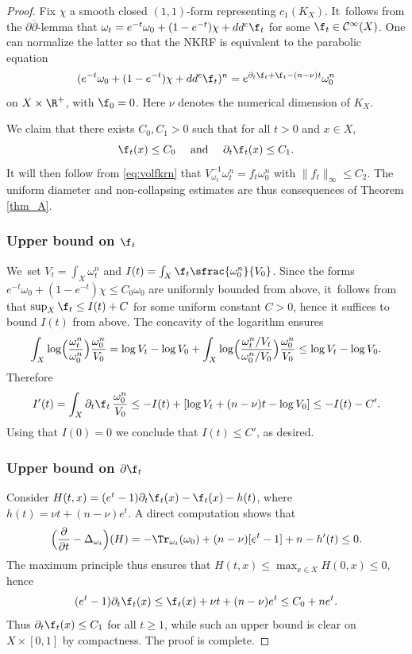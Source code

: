\begin{proof}
Fix $\chi$ a smooth closed $(1,1)$-form representing $c_1(K_X)$. It~follows from the $\partial\overline{\partial}$-lemma
that $\omega_t=e^{-t}\omega_0+(1-e^{-t}) \chi+dd^c \f_t$ for some $\f_t \in {\mathcal C}^{\infty}(X)$. One can normalize
the latter so that the NKRF is equivalent to the parabolic equation
\[
(e^{-t}\omega_0+(1-e^{-t}) \chi+dd^c \f_t)^n=e^{\partial_t \f_t+\f_t-(n-\nu)t} \omega_0^n
\]
on $X \times \R^+$, with $\f_0=0$. Here $\nu$ denotes the numerical dimension of $K_X$.

We claim that there exists $C_0,C_1>0$ such that for all $t>0$ and $x \in X$,
\[
\f_t(x) \leq C_0
\quad \text{ and } \quad
\partial_t \f_t(x) \leq C_1.
\]
It will then follow from \eqref{eq:volfkrn} that $V_{\omega_t}^{-1}\omega_t^n=f_t \omega_0^n$ with
$\|f_t\|_{\infty} \leq C_2$. The uniform diameter and non-collapsing estimates are thus consequences
of Theorem \ref{thm_A}.

\subsubsection*{Upper bound on $\f_t$}
We~set $V_t=\int_X \omega_t^n$ and $I(t)=\int_X \f_t \sfrac{\omega_0^n}{V_0}$.
Since the forms $e^{-t} \omega_0 +(1-e^{-t}) \chi \leq C_0 \omega_0$
are uniformly bounded from above, it~follows from \cite[Prop.\,8.5]{GZbook} that
$\sup_X \f_t \leq I(t)+C$ for some uniform constant $C>0$, hence it suffices to bound
$I(t)$ from above. The concavity of the logarithm ensures
\[
\int_X \log \Bigl( \frac{\omega_t^n}{\omega_0^n} \Bigr) \frac{\omega_0^n}{V_0}
=\log V_t-\log V_0 + \int_X \log \Bigl( \frac{\omega_t^n/V_t}{\omega_0^n/V_0} \Bigr) \frac{\omega_0^n}{V_0}
\leq \log V_t-\log V_0.
\]
Therefore
\[
I'(t)=\int_X \partial_t \f_t\, \frac{\omega_0^n}{V_0} \leq -I(t)+
[\log V_t+(n-\nu)t-\log V_0]\leq -I(t)-C'.
\]
Using that $I(0)=0$ we conclude that $I(t) \leq C'$, as desired.

\subsubsection*{Upper bound on $\partial\f_t$}
Consider $H(t,x)=(e^t-1) \partial_t \f_t(x)-\f_t(x)-h(t)$, where
$h(t)=\nu t+(n-\nu)e^t$. A direct computation shows that
\[
\Bigl( \frac{\partial}{\partial t}-\Delta_{\omega_t} \Bigr)(H)=-\Tr_{\omega_t}(\omega_0)
+(n-\nu)[e^t-1] +n-h'(t) \leq 0.
\]
The maximum principle thus ensures that $H(t,x) \leq \max_{x \in X} H(0,x) \leq 0$, hence
\[
(e^t-1) \partial_t \f_t(x) \leq \f_t(x)+\nu t +(n-\nu)e^t \leq C_0+ne^t.
\]
Thus $\partial_t \f_t(x) \leq C_1$ for all $t \geq 1$, while such an upper bound is
clear on $X \times [0,1]$ by compactness.
The proof is complete.
\end{proof}


